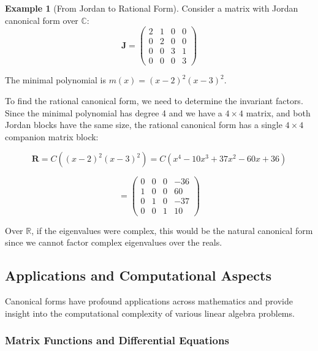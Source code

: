 \documentclass[12pt]{article}
\numberwithin{equation}{section}
\newcommand{\mat}[1]{\mathbf{#1}}        %
\theoremstyle{plain}
\theoremstyle{definition}
\newtheorem{example}[theorem]{Example}
\theoremstyle{remark}
\begin{document}
\begin{example}[From Jordan to Rational Form]
Consider a matrix with Jordan canonical form over $\mathbb{C}$:
$$\mat{J} = \begin{pmatrix} 2 & 1 & 0 & 0 \\ 0 & 2 & 0 & 0 \\ 0 & 0 & 3 & 1 \\ 0 & 0 & 0 & 3 \end{pmatrix}$$

The minimal polynomial is $m(x) = (x-2)^2(x-3)^2$.

To find the rational canonical form, we need to determine the invariant factors. Since the minimal polynomial has degree 4 and we have a $4 \times 4$ matrix, and both Jordan blocks have the same size, the rational canonical form has a single $4 \times 4$ companion matrix block:

$$\mat{R} = C((x-2)^2(x-3)^2) = C(x^4 - 10x^3 + 37x^2 - 60x + 36)$$

$$= \begin{pmatrix} 0 & 0 & 0 & -36 \\ 1 & 0 & 0 & 60 \\ 0 & 1 & 0 & -37 \\ 0 & 0 & 1 & 10 \end{pmatrix}$$

Over $\mathbb{R}$, if the eigenvalues were complex, this would be the natural canonical form since we cannot factor complex eigenvalues over the reals.
\end{example}

\subsection{Applications and Computational Aspects}

Canonical forms have profound applications across mathematics and provide insight into the computational complexity of various linear algebra problems.

\subsubsection{Matrix Functions and Differential Equations}
\end{document}
